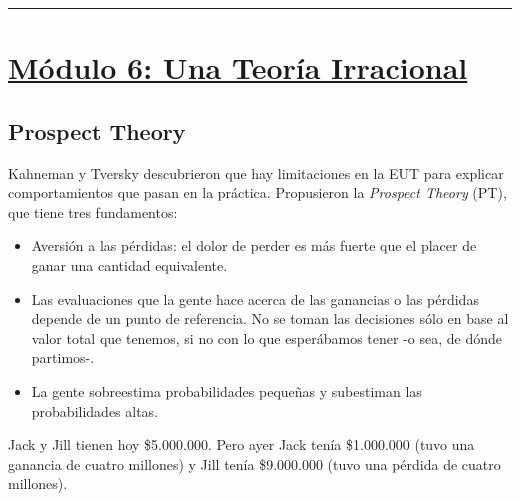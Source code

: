 \documentclass{article}
\newcommand*\sepline{%
  \begin{center}
    \rule[1ex]{.5\textwidth}{.5pt}
  \end{center}}
\begin{document}
    \sepline

    \section*{\underline{Módulo 6: Una Teoría Irracional}}
        \subsection*{Prospect Theory}
            Kahneman y Tversky descubrieron que hay limitaciones en la EUT para explicar comportamientos que pasan en la práctica. Propusieron la \emph{Prospect Theory} (PT), que tiene tres fundamentos:
            \begin{itemize}
                \item Aversión a las pérdidas: el dolor de perder es más fuerte que el placer de ganar una cantidad equivalente.
                \item Las evaluaciones que la gente hace acerca de las ganancias o las pérdidas depende de un punto de referencia. No se toman las decisiones sólo en base al valor total que tenemos, si no con lo que esperábamos tener -o sea, de dónde partimos-.
                \item La gente sobreestima probabilidades pequeñas y subestiman las probabilidades altas.
            \end{itemize}
            Jack y Jill tienen hoy \$5.000.000. Pero ayer Jack tenía \$1.000.000 (tuvo una ganancia de cuatro millones) y Jill tenía \$9.000.000 (tuvo una pérdida de cuatro millones).
\end{document}
